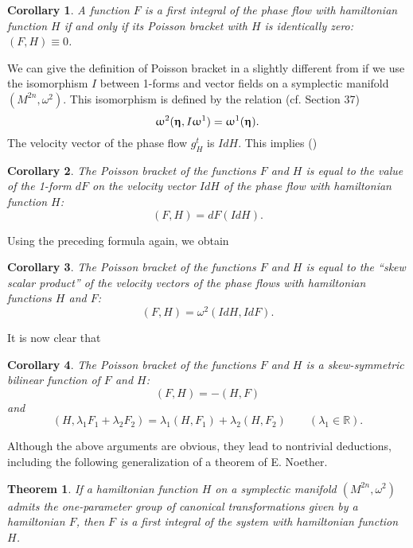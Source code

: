 \documentclass[leqno]{book}
\renewcommand{\pmb}[1]{{
  \renewcommand{\alpha}{\upalpha}
  \renewcommand{\beta}{\upbeta}
  \renewcommand{\gamma}{\upgamma}
  \renewcommand{\delta}{\updelta}
  \renewcommand{\epsilon}{\upepsilon}
  \renewcommand{\varepsilon}{\upvarepsilon}
  \renewcommand{\zeta}{\upzeta}
  \renewcommand{\eta}{\upeta}
  \renewcommand{\theta}{\uptheta}
  \renewcommand{\iota}{\upiota}
  \renewcommand{\kappa}{\upkappa}
  \renewcommand{\lambda}{\uplambda}
  \renewcommand{\mu}{\upmu}
  \renewcommand{\nu}{\upnu}
  \renewcommand{\xi}{\upxi}
  \renewcommand{\pi}{\uppi}
  \renewcommand{\rho}{\uprho}
  \renewcommand{\sigma}{\upsigma}
  \renewcommand{\tau}{\uptau}
  \renewcommand{\upsilon}{\upupsilon}
  \renewcommand{\varphi}{\upvarphi}
  \renewcommand{\phi}{\upphi}
  \renewcommand{\chi}{\upchi}
  \renewcommand{\psi}{\uppsi}
  \renewcommand{\omega}{\upomega}
  \boldsymbol{#1}
}}
\numberwithin{equation}{section}
\theoremstyle{plain}
\newtheorem{cor}{Corollary}
\newtheorem*{thm*}{Theorem}
\theoremstyle{definition}
\theoremstyle{remark}
\theoremstyle{smallcap}
\numberwithin{prob}{section}
\begin{document}
\begin{cor}
  A function $F$ is a first integral of the phase flow
  with hamiltonian function $H$ if and only if its Poisson bracket
  with $H$ is identically zero: $(F, H) \equiv 0$.
\end{cor}

We can give the definition of Poisson bracket in a slightly
different from if we use the isomorphism $I$ between 1-forms
and vector fields on a symplectic manifold $(M^{2n}, \omega^2)$.
%
%
This isomorphism is defined by the relation (cf. Section 37)
$$
\omega^2(\pmb\eta, I\omega^1)
=
\omega^1(\pmb\eta).
$$
The velocity vector of the phase flow $g_H^t$ is $IdH$.
This implies
(\note{$\omega^1 = dF$, $\pmb\eta = IdH$.})

\begin{cor}
  The Poisson bracket of the functions $F$ and $H$
  is equal to the value of the 1-form $dF$
  on the velocity vector $IdH$ of the phase flow with
  hamiltonian function $H$:
  $$
  (F, H) = dF(IdH).
  $$
\end{cor}

Using the preceding formula again, we obtain

\begin{cor}
  The Poisson bracket of the functions $F$ and $H$ is equal to the
  ``skew scalar product'' of the velocity vectors of the phase flows
  with hamiltonian functions $H$ and $F$:
  $$
  (F, H) = \omega^2(IdH, IdF).
  $$
\end{cor}

It is now clear that

\begin{cor}
  The Poisson bracket of the functions $F$ and $H$
  is a skew-symmetric bilinear function of $F$ and $H$:
  $$
  (F, H) = -(H, F)
  $$
  and
  $$
  (H, \lambda_1 F_1 + \lambda_2 F_2)
  =
  \lambda_1 (H, F_1)
  +
  \lambda_2 (H, F_2)
  \qquad
  (\lambda_1 \in \mathbb R).
  $$
\end{cor}

Although the above arguments are obvious,
they lead to nontrivial deductions,
including the following generalization
of a theorem of E. Noether.

\begin{thm*}
  If a hamiltonian function $H$ on a symplectic manifold $(M^{2n}, \omega^2)$
  admits the one-parameter group of canonical transformations
  given by a hamiltonian $F$,
  then $F$ is a first integral of the system with hamiltonian function $H$.
\end{thm*}
\end{document}

